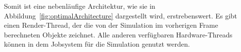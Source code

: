 Somit ist eine nebenläufige Architektur, wie sie in Abbildung~\vref{fig:optimalArchitecture} dargestellt wird, erstrebenswert. Es gibt einen Render-Thread, der die von der Simulation im vorherigen Frame berechneten Objekte zeichnet. Alle anderen verfügbaren Hardware-Threads können in dem Jobsystem für die Simulation genutzt werden.